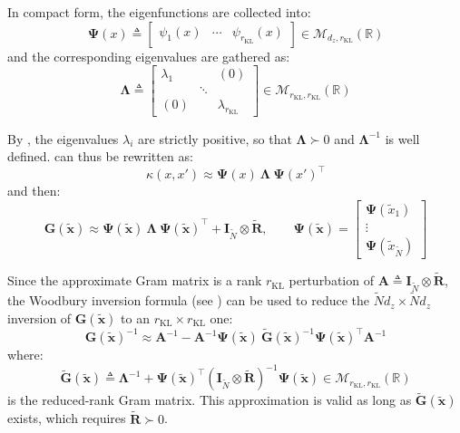 In compact form, the eigenfunctions are collected into:
\begin{equation}
	\boldsymbol{\Psi}(x)\triangleq\begin{bmatrix}
	\psi_1(x)&\cdots&\psi_{r_{\mathrm{KL}}}(x)
	\end{bmatrix}\in\mathcal{M}_{d_z,r_{\mathrm{KL}}}(\mathbb{R})\label{eq:psi_gras}
\end{equation}
and the corresponding eigenvalues are gathered as:
\begin{equation}
	\boldsymbol{\Lambda}\triangleq\begin{bmatrix}
	\lambda_1&&(0)\\&\ddots&\\(0)&&\lambda_{r_{\mathrm{KL}}}
	\end{bmatrix}\in\mathcal{M}_{r_{\mathrm{KL}},r_{\mathrm{KL}}}(\mathbb{R})
\end{equation}

By , the eigenvalues $\lambda_i$ are strictly positive, so that $\boldsymbol{\Lambda}\succ0$ and $\boldsymbol{\Lambda}^{-1}$ is well defined.  can thus be rewritten as:
\begin{equation}
	\kappa(x,x')\approx\boldsymbol{\Psi}(x)\:\boldsymbol{\Lambda}\:\boldsymbol{\Psi}(x')^\top
\end{equation}
and then:
\begin{equation}
	\mathbf{G}(\tilde{\mathbf{x}})\approx\boldsymbol{\Psi}(\tilde{\mathbf{x}})\:\boldsymbol{\Lambda}\:\boldsymbol{\Psi}(\tilde{\mathbf{x}})^\top+\mathbf{I}_{\tilde{N}}\otimes\tilde{\mathbf{R}},\qquad\boldsymbol{\Psi}(\tilde{\mathbf{x}})=\begin{bmatrix}\boldsymbol{\Psi}(\tilde{x}_1)\\\vdots\\\boldsymbol{\Psi}(\tilde{x}_{\tilde{N}})\end{bmatrix}
\end{equation}

Since the approximate Gram matrix is a rank $r_{\mathrm{KL}}$ perturbation of $\mathbf{A}\triangleq \mathbf{I}_{\tilde{N}}\otimes\tilde{\mathbf{R}}$, the Woodbury inversion formula (see ) can be used to reduce the $\tilde{N}d_z\times\tilde{N}d_z$ inversion of $\mathbf{G}(\tilde{\mathbf{x}})$ to an $r_{\mathrm{KL}}\times r_{\mathrm{KL}}$ one:
\begin{equation}
	\mathbf{G}(\tilde{\mathbf{x}})^{-1}\approx \mathbf{A}^{-1}-\mathbf{A}^{-1}\boldsymbol{\Psi}(\tilde{\mathbf{x}})\:\tilde{\mathbf{G}}(\tilde{\mathbf{x}})^{-1}\boldsymbol{\Psi}(\tilde{\mathbf{x}})^\top \mathbf{A}^{-1}\label{eq:reduced_rank_Gram}
\end{equation}
where:
\begin{equation}
	\tilde{\mathbf{G}}(\tilde{\mathbf{x}})\triangleq\boldsymbol{\Lambda}^{-1}+\boldsymbol{\Psi}(\tilde{\mathbf{x}})^\top\left(\mathbf{I}_{\tilde{N}}\otimes\tilde{\mathbf{R}}\right)^{-1}\boldsymbol{\Psi}(\tilde{\mathbf{x}})\in\mathcal{M}_{r_{\mathrm{KL}},r_{\mathrm{KL}}}(\mathbb{R})
\end{equation}
is the reduced-rank Gram matrix. This approximation is valid as long as $\tilde{\mathbf{G}}(\tilde{\mathbf{x}})$ exists, which requires $\tilde{\mathbf{R}}\succ0$.

